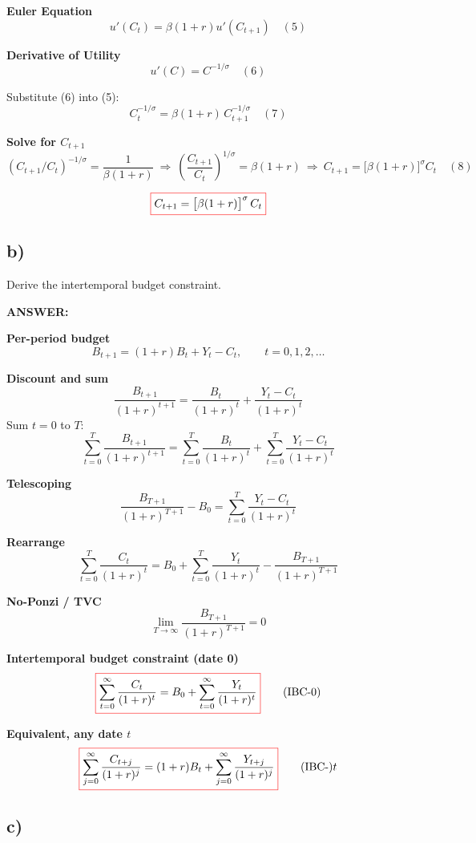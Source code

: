 \documentclass[12pt]{article}
\begin{document}
\textbf{Euler Equation}
\[
u'(C_t)=\beta(1+r)u'(C_{t+1})
\quad (5)
\]

\textbf{Derivative of Utility}
\[
u'(C)=C^{-1/\sigma}
\quad (6)
\]

Substitute (6) into (5):
\[
C_t^{-1/\sigma}=\beta(1+r)\,C_{t+1}^{-1/\sigma}
\quad (7)
\]

\textbf{Solve for \(C_{t+1}\)}
\[
(C_{t+1}/C_t)^{-1/\sigma}=\frac{1}{\beta(1+r)}
\ \Rightarrow\
\left(\frac{C_{t+1}}{C_t}\right)^{1/\sigma}=\beta(1+r)
\ \Rightarrow\
C_{t+1}=\big[\beta(1+r)\big]^{\sigma} C_t
\quad (8)
\]

\[
\fcolorbox{red}{white}{$\displaystyle C_{t+1}=\big[\beta(1+r)\big]^{\sigma}\,C_t$}
\]

\subsection*{\noindent\textbf{b)}}

Derive the intertemporal budget constraint.

\vspace{0.5em}
\noindent\textcolor{formalred}{\textbf{ANSWER:}}

\textbf{Per-period budget}
\[
B_{t+1}=(1+r)B_t+Y_t-C_t, \qquad t=0,1,2,\dots \tag{1}
\]

\textbf{Discount and sum}
\[
\frac{B_{t+1}}{(1+r)^{t+1}}=\frac{B_t}{(1+r)^t}+\frac{Y_t-C_t}{(1+r)^t} \tag{2}
\]
Sum \(t=0\) to \(T\):
\[
\sum_{t=0}^{T}\frac{B_{t+1}}{(1+r)^{t+1}}
=\sum_{t=0}^{T}\frac{B_t}{(1+r)^t}
+\sum_{t=0}^{T}\frac{Y_t-C_t}{(1+r)^t} \tag{3}
\]

\textbf{Telescoping}
\[
\frac{B_{T+1}}{(1+r)^{T+1}}-B_0
=\sum_{t=0}^{T}\frac{Y_t-C_t}{(1+r)^t} \tag{4}
\]

\textbf{Rearrange}
\[
\sum_{t=0}^{T}\frac{C_t}{(1+r)^t}
= B_0+\sum_{t=0}^{T}\frac{Y_t}{(1+r)^t}
-\frac{B_{T+1}}{(1+r)^{T+1}} \tag{5}
\]

\textbf{No-Ponzi / TVC}
\[
\lim_{T\to\infty}\frac{B_{T+1}}{(1+r)^{T+1}}=0 \tag{6}
\]

\textbf{Intertemporal budget constraint (date 0)}
\[
\fcolorbox{red}{white}{$\displaystyle
\sum_{t=0}^{\infty}\frac{C_t}{(1+r)^t}
= B_0+\sum_{t=0}^{\infty}\frac{Y_t}{(1+r)^t}
$} \tag{IBC-0}
\]

\textbf{Equivalent, any date \(t\)}
\[
\fcolorbox{red}{white}{$\displaystyle
\sum_{j=0}^{\infty}\frac{C_{t+j}}{(1+r)^j}
=(1+r)B_t+\sum_{j=0}^{\infty}\frac{Y_{t+j}}{(1+r)^j}
$} \tag{IBC-}t
\]

\subsection*{\noindent\textbf{c)}}
\end{document}
